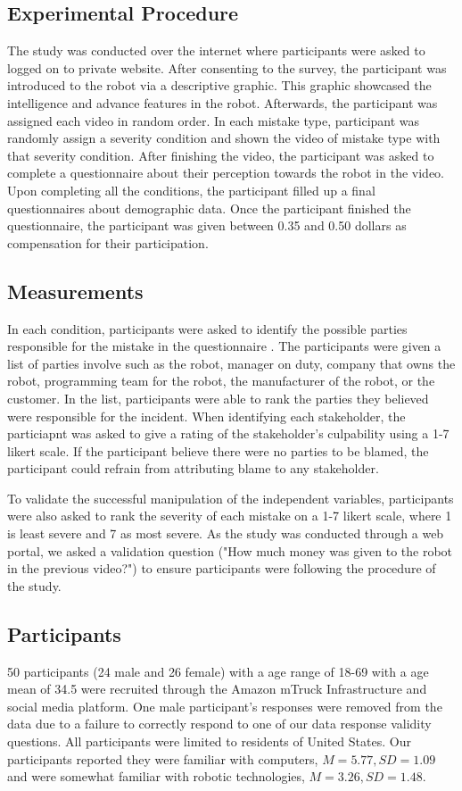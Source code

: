 \documentclass{sigchi}
\begin{document}
\subsection{Experimental Procedure}
The study was conducted over the internet where participants were asked to logged on to private website. After consenting to the survey, the participant was introduced to the robot via a descriptive graphic. This graphic showcased the intelligence and advance features in the robot. Afterwards, the participant was assigned each video in random order. In each mistake type, participant was randomly assign a severity condition and shown the video of mistake type with that severity condition. After finishing the video, the participant was asked to complete a questionnaire about their perception towards the robot in the video. Upon completing all the conditions, the participant filled up a final questionnaires about demographic data. Once the participant finished the questionnaire, the participant was given between 0.35 and 0.50 dollars as compensation for their participation.

\subsection{Measurements}
In each condition, participants were asked to identify the possible parties responsible for the mistake in the questionnaire . The participants were given a list of parties involve such as the robot, manager on duty, company that owns the robot, programming team for the robot, the manufacturer of the robot, or the customer. In the list, participants were able to rank the parties they believed were responsible for the incident. When identifying each stakeholder, the particiapnt was asked to give a rating of the stakeholder's culpability using a 1-7 likert scale. If the participant believe there were no parties to be blamed, the participant could refrain from attributing blame to any stakeholder. 

To validate the successful manipulation of the independent variables, participants were also asked to rank the severity of each mistake on a 1-7 likert scale, where 1 is least severe and 7 as most severe. As the study was conducted through a web portal, we asked a validation question ("How much money was given to the robot in the previous video?") to ensure participants were following the procedure of the study.

\subsection{Participants}
50 participants (24 male and 26 female) with a age range of 18-69 with a age mean of 34.5 were recruited through the Amazon mTruck Infrastructure and social media platform. One male participant's responses were removed from the data due to a failure to correctly respond to one of our data response validity questions. All participants were limited to residents of United States. Our participants reported they were familiar with computers, $M=5.77, SD=1.09$ and were somewhat familiar with robotic technologies, $M=3.26, SD=1.48$.
\end{document}
